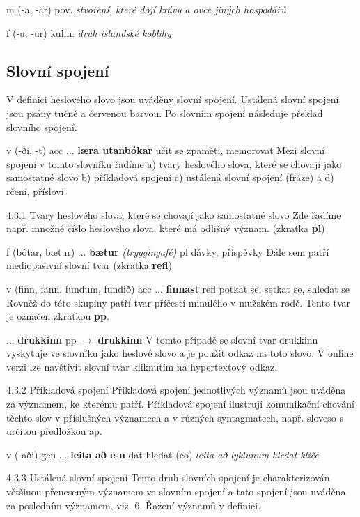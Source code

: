  {\small{ m (-a, -ar)} 
\footnotesize{pov.} \textit{stvoření, které dojí krávy a ovce jiných hospodářů}}

 {\small{ f (-u, -ur)} 
\footnotesize{kulin. }\textit{druh islandské koblihy }}

\subsection{Slovní spojení}
V definici heslového slovo jsou uváděny slovní spojení. Ustálená slovní spojení jsou psány tučně a červenou barvou. Po slovním spojení následuje překlad slovního spojení. 

 {\small{v (-ði, -t) acc}
...
\textbf{læra utanbókar} {učit se zpaměti, memorovat}}
Mezi slovní spojení v tomto slovníku řadíme a) tvary heslového slova, které se chovají jako samostatné slovo b) příkladová spojení c) ustálená slovní spojení (fráze) a d) rčení, přísloví. 

4.3.1 	Tvary heslového slova, které se chovají jako samostatné slovo 
Zde řadíme např. množné číslo heslového slova, které má odlišný význam. (zkratka \textbf{pl})

 {\small{ f (bótar, bætur)}
...
\textbf{bætur} \textit{(tryggingafé)} {\small{ pl} {dávky, příspěvky} }}
Dále sem patří mediopasivní slovní tvar (zkratka \textbf{refl})

 {\small{ v (finn, fann, fundum, fundið) acc}
...
\textbf{finnast} {\small{ refl} {potkat se, setkat se, shledat se} }}
Rovněž do této skupiny patří tvar příčestí minulého v mužském rodě. Tento tvar je označen zkratkou \textbf{pp}. 

 {
...
\textbf{drukkinn} {\small{ pp }} {$\rightarrow$} \textbf{drukkinn}}
V tomto případě se slovní tvar drukkinn vyskytuje ve slovníku jako heslové slovo a je použit odkaz na toto slovo. V online verzi lze navštívit slovní tvar kliknutím na hypertextový odkaz.

4.3.2	 Příkladová spojení
Příkladová spojení  jednotlivých významů jsou uváděna za významem, ke kterému patří. Příkladová spojení ilustrují komunikační chování těchto slov v příslušných významech a v různých syntagmatech, např. sloveso s určitou předložkou ap. 

 {\small{ v (-aði) gen}
...
\textbf{leita að e-u} \small{dat} {hledat (co)}
	\textit{leita að lyklunum} \textit{hledat klíče}  }

4.3.3	 Ustálená slovní spojení 
Tento druh slovních spojení je charakterizován většinou přeneseným významem ve slovním spojení a tato spojení jsou uváděna za posledním významem, viz. 6. Řazení významů v definici. 

